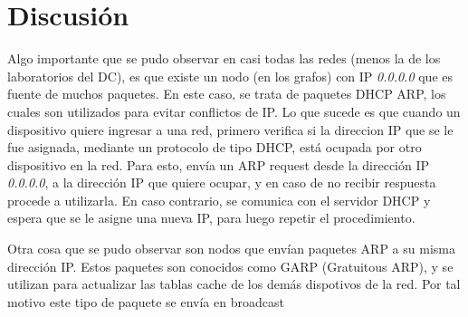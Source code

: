 \section{Discusión}

Algo importante que se pudo observar en casi todas las redes (menos la de los laboratorios del DC), es que existe un nodo (en los grafos) con IP \textit{0.0.0.0} que es fuente de muchos paquetes. En este caso, se trata de paquetes DHCP ARP, los cuales son utilizados para evitar conflictos de IP. Lo que sucede es que cuando un dispositivo quiere ingresar a una red, primero verifica si la direccion IP que se le fue asignada, mediante un protocolo de tipo DHCP, está ocupada por otro dispositivo en la red. Para esto, envía un ARP request desde la dirección IP \textit{0.0.0.0}, a la dirección IP que quiere ocupar, y en caso de no recibir respuesta procede a utilizarla. En caso contrario, se comunica con el servidor DHCP y espera que se le asigne una nueva IP, para luego repetir el procedimiento.

Otra cosa que se pudo observar son nodos que envían paquetes ARP a su misma dirección IP. Estos paquetes son conocidos como GARP (Gratuitous ARP), y se utilizan para actualizar las tablas cache de los demás dispotivos de la red. Por tal motivo este tipo de paquete se envía en broadcast
